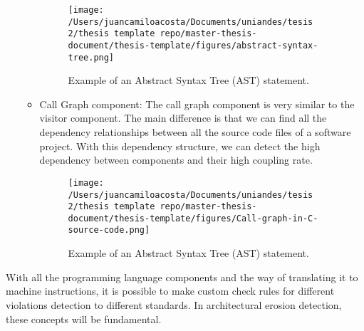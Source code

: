 \begin{itemize}
\begin{itemize}
\begin{figure}
    				\centering
    				\texttt{[image: /Users/juancamiloacosta/Documents/uniandes/tesis 2/thesis template repo/master-thesis-document/thesis-template/figures/abstract-syntax-tree.png]}
   				 \caption{Example of an Abstract Syntax Tree (AST) statement. \citet{} }
   				 \label{fig:ast}
			\end{figure}
			\item Call Graph component: The call graph component is very similar to the visitor component. The main difference is that we can find all the dependency relationships between all the source code files of a software project. With this dependency structure, we can detect the high dependency between components and their high coupling rate.
			\begin{figure}
    				\centering
    				\texttt{[image: /Users/juancamiloacosta/Documents/uniandes/tesis 2/thesis template repo/master-thesis-document/thesis-template/figures/Call-graph-in-C-source-code.png]}
   				 \caption{Example of an Abstract Syntax Tree (AST) statement. \citet{} }
   				 \label{fig:ast}
			\end{figure}
		\end{itemize}
\end{itemize}

With all the programming language components and the way of translating it to machine instructions, it is possible to make custom check rules for different violations detection to different standards. In architectural erosion detection, these concepts will be fundamental.




